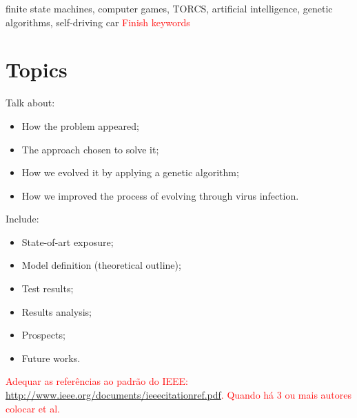 \documentclass[journal]{IEEEtran}
\newcommand{\toDo}[1]{\textcolor{red}{#1}}
\begin{document}
	\begin{IEEEkeywords}
		
		finite state machines, computer games, TORCS, artificial intelligence, genetic algorithms, self-driving car
		\toDo{Finish keywords}
		
	\end{IEEEkeywords}
	
	\section{Topics}%
	
		Talk about:
		
		\begin{itemize}
			\item How the problem appeared;
			\item The approach chosen to solve it;
			\item How we evolved it by applying a genetic algorithm;
			\item How we improved the process of evolving through virus infection.
		\end{itemize}
		
		Include:
		\begin{itemize}
			\item State-of-art exposure;
			\item Model definition (theoretical outline);
			\item Test results;
			\item Results analysis;
			\item Prospects;
			\item Future works.
		\end{itemize}
		\newpage
	
	
	
	
	
	
	
	
	
	
	
	
	\toDo{Adequar as referências ao padrão do IEEE: \url{http://www.ieee.org/documents/ieeecitationref.pdf}. Quando
	há 3 ou mais autores colocar et al.}
	
	
	
\end{document}

